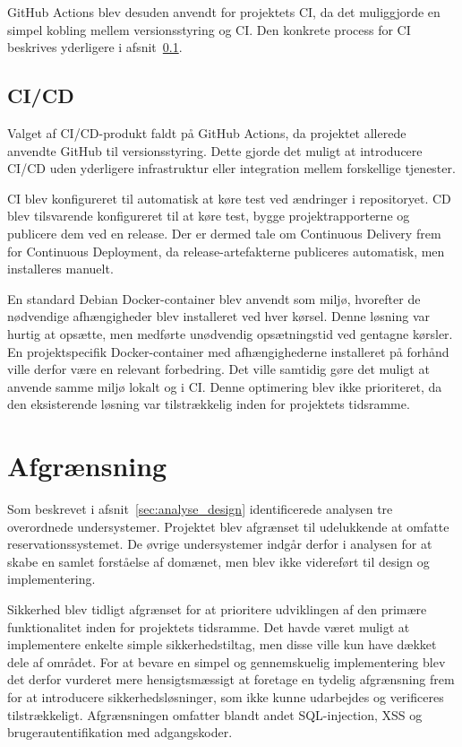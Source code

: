 \documentclass[a4paper, 11pt]{article}
\begin{document}
GitHub Actions blev desuden anvendt for projektets CI, da det muliggjorde en
simpel kobling mellem versionsstyring og CI. Den konkrete process for CI
beskrives yderligere i afsnit~\ref{sec:ci_cd}.

\subsection{CI/CD}
\label{sec:ci_cd}

Valget af CI/CD-produkt faldt på GitHub Actions, da projektet allerede anvendte GitHub til
versionsstyring. Dette gjorde det muligt at introducere CI/CD uden yderligere infrastruktur
eller integration mellem forskellige tjenester.

CI blev konfigureret til automatisk at køre test ved ændringer i repositoryet. CD blev
tilsvarende konfigureret til at køre test, bygge projektrapporterne og publicere dem ved
en release. Der er dermed tale om Continuous Delivery frem for Continuous Deployment, da
release-artefakterne publiceres automatisk, men installeres manuelt.

En standard Debian Docker-container blev anvendt som miljø, hvorefter de nødvendige
afhængigheder blev installeret ved hver kørsel. Denne løsning var hurtig at opsætte, men
medførte unødvendig opsætningstid ved gentagne kørsler. En projektspecifik Docker-container
med afhængighederne installeret på forhånd ville derfor være en relevant forbedring. Det
ville samtidig gøre det muligt at anvende samme miljø lokalt og i CI. Denne optimering
blev ikke prioriteret, da den eksisterende løsning var tilstrækkelig inden for projektets
tidsramme.

\section{Afgrænsning}

Som beskrevet i afsnit~\ref{sec:analyse_design} identificerede analysen tre overordnede
undersystemer. Projektet blev afgrænset til udelukkende at omfatte reservationssystemet. De
øvrige undersystemer indgår derfor i analysen for at skabe en samlet forståelse af domænet,
men blev ikke videreført til design og implementering.

Sikkerhed blev tidligt afgrænset for at prioritere udviklingen af den primære funktionalitet
inden for projektets tidsramme. Det havde været muligt at implementere enkelte simple
sikkerhedstiltag, men disse ville kun have dækket dele af området. For at bevare en simpel
og gennemskuelig implementering blev det derfor vurderet mere hensigtsmæssigt at foretage
en tydelig afgrænsning frem for at introducere sikkerhedsløsninger, som ikke kunne
udarbejdes og verificeres tilstrækkeligt. Afgrænsningen omfatter blandt andet SQL-injection,
XSS og brugerautentifikation med adgangskoder.
\end{document}

